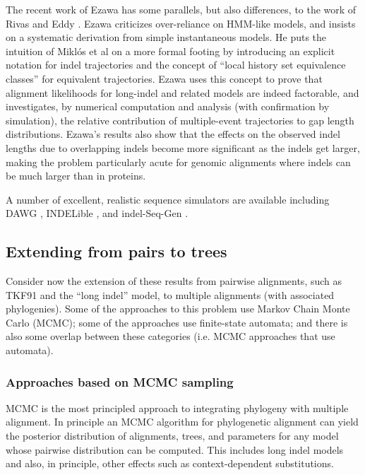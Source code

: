 \documentclass{bmcart}
\begin{document}
The recent work of Ezawa has some parallels, but also differences,
to the work of Rivas and Eddy \cite{Ezawa2016a,Ezawa2016b,Ezawa2016bErratum}.
Ezawa criticizes over-reliance on HMM-like models, and insists on a systematic derivation from simple instantaneous models.
He puts the intuition of Mikl\'{o}s et al \cite{MiklosLunterHolmes2004}
on a more formal footing by introducing an explicit notation for indel trajectories
and the concept of ``local history set equivalence classes'' for equivalent trajectories.
Ezawa uses this concept to prove that alignment likelihoods for long-indel and related models are indeed factorable,
and investigates, \color{red} by numerical computation and analysis (with confirmation by simulation), \color{black} the relative contribution
of multiple-event trajectories to gap length distributions.
\color{red}
Ezawa's results also show that the effects on the observed indel lengths due to overlapping indels become more significant as the indels get larger,
making the problem particularly acute for genomic alignments where indels can be much larger than in proteins.

A number of excellent, realistic sequence simulators are available
including DAWG \cite{Cartwright2005}, INDELible \cite{pmid19423664},
and indel-Seq-Gen \cite{pmid19651852}.
\color{black}

\subsection*{Extending from pairs to trees}

Consider now the extension of these results from pairwise alignments,
such as TKF91 and the ``long indel'' model, to multiple alignments (with associated phylogenies).
Some of the approaches to this problem
use Markov Chain Monte Carlo (MCMC);
some of the approaches use finite-state automata;
and there is also some overlap between these categories (i.e. MCMC approaches that use automata).

\subsubsection*{Approaches based on MCMC sampling}

MCMC is the most principled approach to integrating phylogeny with multiple alignment.
In principle an MCMC algorithm for phylogenetic alignment can yield the posterior distribution of
alignments, trees, and parameters for any model whose pairwise distribution can be computed.
This includes long indel models and also, in principle, other effects such as context-dependent substitutions.
\end{document}
